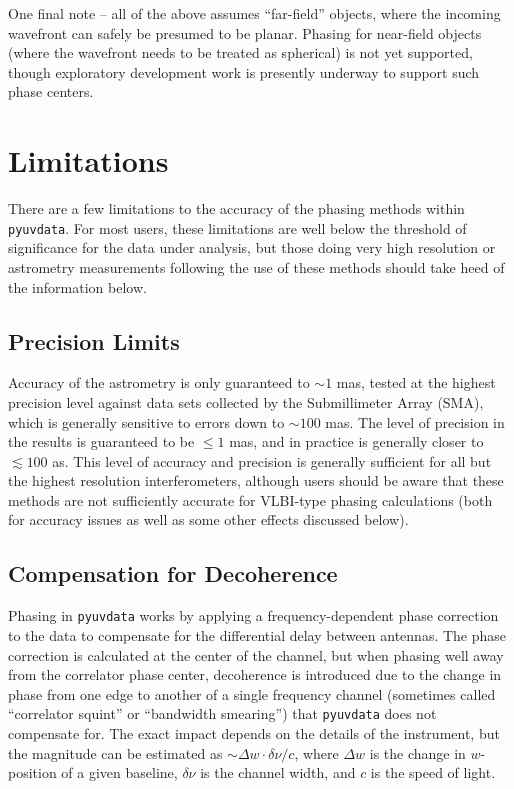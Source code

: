 \documentclass[11pt, oneside]{article}
\begin{document}
One final note -- all of the above assumes ``far-field'' objects, where the incoming wavefront can safely be presumed to be planar. Phasing for near-field objects (where the wavefront needs to be treated as spherical) is not yet supported, though exploratory development work is presently underway to support such phase centers.

\section{Limitations}\label{sec:limits}
There are a few limitations to the accuracy of the phasing methods within \texttt{pyuvdata}. For most users, these limitations are well below the threshold of significance for the data under analysis, but those doing very high resolution or astrometry measurements following the use of these methods should take heed of the information below.

\subsection{Precision Limits}
Accuracy of the astrometry is only guaranteed to $\sim1$ mas, tested at the highest precision level against data sets collected by the Submillimeter Array (SMA), which is generally sensitive to errors down to $\sim100$ mas. The level of precision in the results is guaranteed to be $\leq1$ mas, and in practice is generally closer to $\lesssim100$ {\textmu}as. This level of accuracy and precision is generally sufficient for all but the highest resolution interferometers, although users should be aware that these methods are not sufficiently accurate for VLBI-type phasing calculations (both for accuracy issues as well as some other effects discussed below). 

\subsection{Compensation for Decoherence}
Phasing in \texttt{pyuvdata} works by applying a frequency-dependent phase correction to the data to compensate for the differential delay between antennas. The phase correction is calculated at the center of the channel, but when phasing well away from the correlator phase center, decoherence is introduced due to the change in phase from one edge to another of a single frequency channel (sometimes called ``correlator squint'' or ``bandwidth smearing'') that \texttt{pyuvdata} does not compensate for. The exact impact depends on the details of the instrument, but the magnitude can be estimated as $\sim\Delta w \cdot \delta\nu / c$, where $\Delta w$ is the change in $w$-position of a given baseline, $\delta\nu$ is the channel width, and $c$ is the speed of light.
\end{document}
